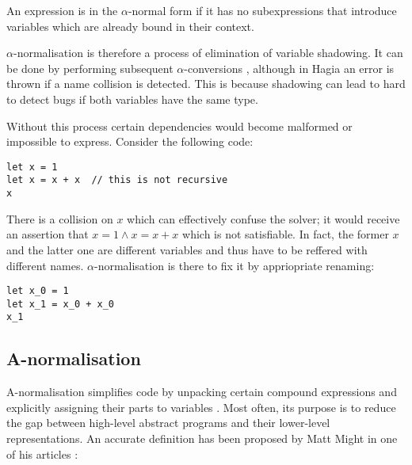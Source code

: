 \begin{defi}
  An expression is in the $\alpha$-normal form if it has no subexpressions that
  introduce variables which are already bound in their context.
\end{defi}

$\alpha$-normalisation is therefore a process of elimination of variable
shadowing. It can be done by performing subsequent $\alpha$-conversions
\cite{alpha_norm}, although in Hagia an error is thrown if a name collision is
detected. This is because shadowing can lead to hard to detect bugs if both
variables have the same type.

Without this process certain dependencies would become malformed or impossible
to express. Consider the following code:

\begin{minipage}{\linewidth}
\begin{lstlisting}[language=sophia]
let x = 1
let x = x + x  // this is not recursive
x
\end{lstlisting}
\end{minipage}

There is a collision on $x$ which can effectively confuse the solver; it would
receive an assertion that $x = 1 \land x = x + x$ which is not satisfiable. In
fact, the former $x$ and the latter one are different variables and thus have to
be reffered with different names. $\alpha$-normalisation is there to fix it by
appriopriate renaming:

\begin{minipage}{\linewidth}
\begin{lstlisting}[language=sophia]
let x_0 = 1
let x_1 = x_0 + x_0
x_1
\end{lstlisting}
\end{minipage}

\subsection{A-normalisation}

A-normalisation simplifies code by unpacking certain compound expressions and
explicitly assigning their parts to variables \cite{10.1145/173262.155113}. Most
often, its purpose is to reduce the gap between high-level abstract programs and
their lower-level representations. An accurate definition has been proposed by
Matt Might in one of his articles \cite{a_norm}:

